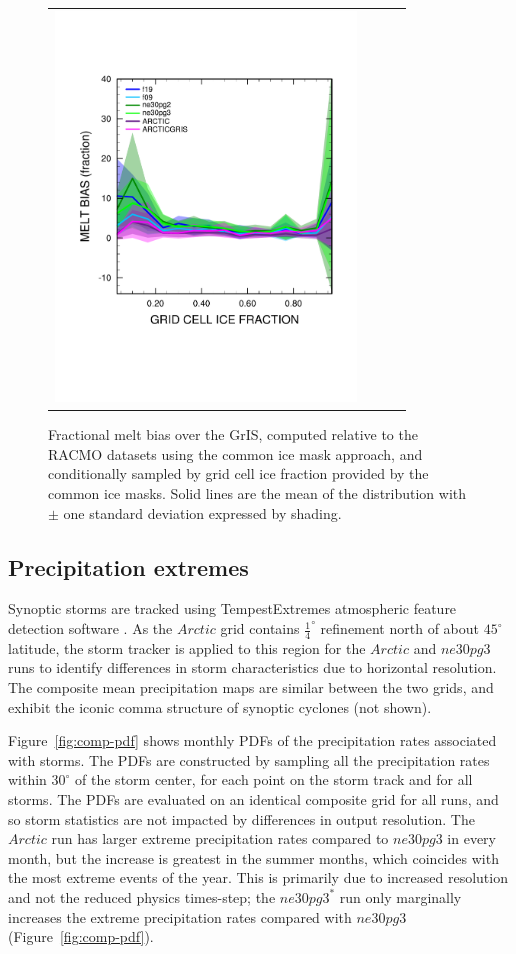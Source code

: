 \documentclass[draft]{agujournal2019}
\begin{document}
\begin{figure}[t]
\begin{center}
\begin{tabular}{cccc}
         \includegraphics[width=80mm]{figs/temp_xy_diffRACMO_melt.pdf}
\end{tabular}
\end{center}
\caption{Fractional melt bias over the GrIS, computed relative to the RACMO datasets using the common ice mask approach, and conditionally sampled by grid cell ice fraction provided by the common ice masks. Solid lines are the mean of the distribution with $\pm$ one standard deviation expressed by shading.}
\label{fig:bias}
\end{figure}

\subsection{Precipitation extremes}

Synoptic storms are tracked using TempestExtremes atmospheric feature detection software \cite{UETAL2021}. As the $Arctic$ grid contains $\frac{1}{4}^{\circ}$ refinement north of about $45^{\circ}$ latitude, the storm tracker is applied to this region for the $Arctic$ and $ne30pg3$ runs to identify differences in storm characteristics due to horizontal resolution. The composite mean precipitation maps are similar between the two grids, and exhibit the iconic comma structure of synoptic cyclones (not shown).

Figure~\ref{fig:comp-pdf} shows monthly PDFs of the precipitation rates associated with storms. The PDFs are constructed by sampling all the precipitation rates within $30^{\circ}$ of the storm center, for each point on the storm track and for all storms. The PDFs are evaluated on an identical composite grid for all runs, and so storm statistics are not impacted by differences in output resolution. The $Arctic$ run has larger extreme precipitation rates compared to $ne30pg3$ in every month, but the increase is greatest in the summer months, which coincides with the most extreme events of the year. This is primarily due to increased resolution and not the reduced physics times-step; the $ne30pg3^{*}$ run only marginally increases the extreme precipitation rates compared with $ne30pg3$ (Figure~\ref{fig:comp-pdf}).
\end{document}
